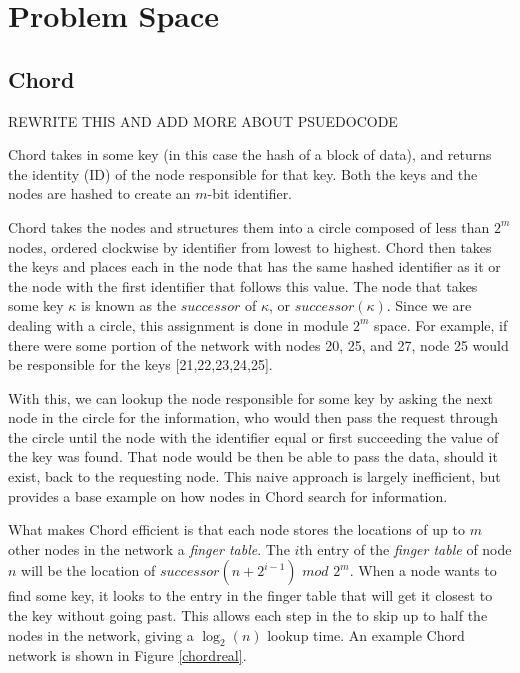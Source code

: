 \documentclass[10pt, conference, compsocconf, letterpaper]{IEEEtran} %
\title{}
\author{Andrew Rosen \qquad Brendan Benshoof }
\date{} %
\begin{document}
\maketitle

\section{Problem Space}


\subsection{Chord}

REWRITE THIS AND ADD MORE ABOUT PSUEDOCODE 

Chord \cite{Chord} takes in some key (in this case the hash of a block of data), and returns the identity (ID) of the node responsible for that key.  Both the keys and the nodes are hashed to create an $m$-bit identifier.

Chord takes the nodes and structures them into a circle composed of less than $2^m$ nodes, ordered clockwise by identifier from lowest to highest.  Chord then takes the keys and places each in the node that has the same hashed identifier as it or the node with the first identifier that follows this value.  The node that takes some key $\kappa$ is known as the $successor$ of $\kappa$, or $successor(\kappa)$.  Since we are dealing with a circle, this assignment is done in module $2^m$ space.  For example, if there were some portion of the network with nodes 20, 25, and 27, node 25 would be responsible for the keys [21,22,23,24,25].


With this, we can lookup the node responsible for some key by asking the next node in the circle for the information, who would then pass the request through the circle until the node with the identifier equal or first succeeding the value of the key was found.  That node would be then be able to pass the data, should it exist, back to the requesting node.  This naive approach is largely inefficient, but provides a base example on how nodes in Chord search for information.

What makes Chord efficient is that each node stores the locations of up to $m$ other nodes in the network a \emph{finger table}.  The $i$th entry of the \emph{finger table} of  node $n$ will be the location of $successor(n+2^{i-1})$ $mod$ $2^m$. When a node wants to find some key, it looks to the entry in the finger table that will get it closest to the key without going past.  This allows each step in the to skip up to half the nodes in the network, giving a $\log_2(n)$ lookup time. An example Chord network is shown in Figure \ref{chordreal}.
\end{document}
